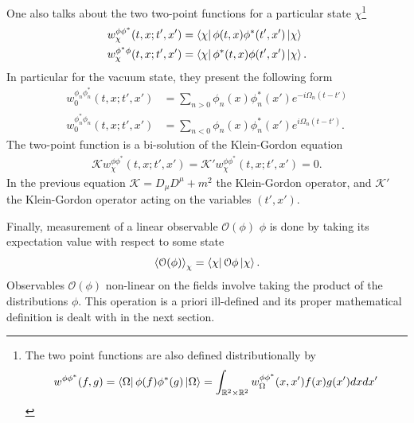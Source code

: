 One also talks about the two two-point functions for a particular state $\chi$\footnote{The two point functions are also defined distributionally by 
\begin{align}
	w^{\phi \phi^*}(f, g) = \bra{\Omega} \phi(f)\phi^*(g) \ket{\Omega} = \int_{\mathbb{R}^2\times \mathbb{R}^2}^{}  w^{\phi\phi^*}_\Omega(x, x') f(x) g(x')dx dx'
\end{align}}
\begin{align}
	w_\chi^{\phi \phi^*}(t, x; t', x') &= \bra{\chi} \phi(t, x) \phi^*(t', x') \ket{\chi}  \\
	w_\chi^{\phi^* \phi}(t, x; t', x') &= \bra{\chi} \phi^*(t, x) \phi(t', x') \ket{\chi}.
\end{align}
In particular for the vacuum state, they present the following form
\begin{align}
	w_0^{\phi_n \phi_n^*}(t, x; t', x') &= \sum_{n>0}^{}  \phi_n(x)\phi_n^*(x') e^{-i\Omega_n(t-t')} \\
		w_0^{\phi_n^*\phi_n }(t, x; t', x') &= \sum_{n<0}^{}  \phi_n(x)\phi_n^*(x') e^{i\Omega_n(t-t')}.
\end{align}
The two-point function is a bi-solution of the Klein-Gordon equation
\begin{align}
	\mathcal{K}w_\chi^{\phi \phi^*}(t, x; t', x')  
	= \mathcal{K'} w_\chi^{\phi \phi^*}(t, x; t', x')   = 0.
\end{align}
In the previous equation $\mathcal{K} = D_\mu D^{\mu} + m^2$ the Klein-Gordon operator, and $\mathcal{K'}$ the Klein-Gordon operator acting on the variables $(t', x')$.

Finally, measurement of a linear observable $\mathcal{O}(\phi)$ $\phi$ is done by taking its expectation value with respect to some state 
\begin{align}
	\left< \mathcal{O}(\phi) \right>_\chi =\bra{\chi} \mathcal{O}\phi \ket{\chi} .
\end{align}
Observables $\mathcal{O}(\phi)$ non-linear on the fields involve taking the product of the distributions $\phi$. This operation is a priori ill-defined and its proper mathematical definition is dealt with in the next section.

